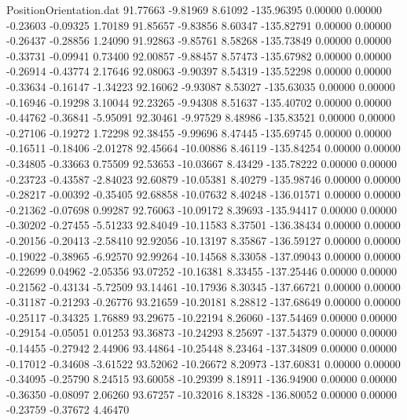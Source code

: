 \begin{filecontents}{PositionOrientation.dat}
  91.77663   -9.81969    8.61092  -135.96395    0.00000    0.00000   -0.23603   -0.09325    1.70189
  91.85657   -9.83856    8.60347  -135.82791    0.00000    0.00000   -0.26437   -0.28856    1.24090
  91.92863   -9.85761    8.58268  -135.73849    0.00000    0.00000   -0.33731   -0.09941    0.73400
  92.00857   -9.88457    8.57473  -135.67982    0.00000    0.00000   -0.26914   -0.43774    2.17646
  92.08063   -9.90397    8.54319  -135.52298    0.00000    0.00000   -0.33634   -0.16147   -1.34223
  92.16062   -9.93087    8.53027  -135.63035    0.00000    0.00000   -0.16946   -0.19298    3.10044
  92.23265   -9.94308    8.51637  -135.40702    0.00000    0.00000   -0.44762   -0.36841   -5.95091
  92.30461   -9.97529    8.48986  -135.83521    0.00000    0.00000   -0.27106   -0.19272    1.72298
  92.38455   -9.99696    8.47445  -135.69745    0.00000    0.00000   -0.16511   -0.18406   -2.01278
  92.45664  -10.00886    8.46119  -135.84254    0.00000    0.00000   -0.34805   -0.33663    0.75509
  92.53653  -10.03667    8.43429  -135.78222    0.00000    0.00000   -0.23723   -0.43587   -2.84023
  92.60879  -10.05381    8.40279  -135.98746    0.00000    0.00000   -0.28217   -0.00392   -0.35405
  92.68858  -10.07632    8.40248  -136.01571    0.00000    0.00000   -0.21362   -0.07698    0.99287
  92.76063  -10.09172    8.39693  -135.94417    0.00000    0.00000   -0.30202   -0.27455   -5.51233
  92.84049  -10.11583    8.37501  -136.38434    0.00000    0.00000   -0.20156   -0.20413   -2.58410
  92.92056  -10.13197    8.35867  -136.59127    0.00000    0.00000   -0.19022   -0.38965   -6.92570
  92.99264  -10.14568    8.33058  -137.09043    0.00000    0.00000   -0.22699    0.04962   -2.05356
  93.07252  -10.16381    8.33455  -137.25446    0.00000    0.00000   -0.21562   -0.43134   -5.72509
  93.14461  -10.17936    8.30345  -137.66721    0.00000    0.00000   -0.31187   -0.21293   -0.26776
  93.21659  -10.20181    8.28812  -137.68649    0.00000    0.00000   -0.25117   -0.34325    1.76889
  93.29675  -10.22194    8.26060  -137.54469    0.00000    0.00000   -0.29154   -0.05051    0.01253
  93.36873  -10.24293    8.25697  -137.54379    0.00000    0.00000   -0.14455   -0.27942    2.44906
  93.44864  -10.25448    8.23464  -137.34809    0.00000    0.00000   -0.17012   -0.34608   -3.61522
  93.52062  -10.26672    8.20973  -137.60831    0.00000    0.00000   -0.34095   -0.25790    8.24515
  93.60058  -10.29399    8.18911  -136.94900    0.00000    0.00000   -0.36350   -0.08097    2.06260
  93.67257  -10.32016    8.18328  -136.80052    0.00000    0.00000   -0.23759   -0.37672    4.46470

\end{filecontents}

